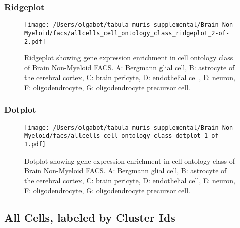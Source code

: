 \newpage
\newpage
\subsubsection{Ridgeplot}
\begin{figure}[h]
\centering
\texttt{[image: /Users/olgabot/tabula-muris-supplemental/Brain\_Non-Myeloid/facs/allcells\_cell\_ontology\_class\_ridgeplot\_2-of-2.pdf]}

\caption{ Ridgeplot  showing gene expression enrichment in cell ontology class of Brain Non-Myeloid FACS. A: Bergmann glial cell, B: astrocyte of the cerebral cortex, C: brain pericyte, D: endothelial cell, E: neuron, F: oligodendrocyte, G: oligodendrocyte precursor cell.}
\end{figure}


\newpage
\newpage
\subsubsection{Dotplot}
\begin{figure}[h]
\centering
\texttt{[image: /Users/olgabot/tabula-muris-supplemental/Brain\_Non-Myeloid/facs/allcells\_cell\_ontology\_class\_dotplot\_1-of-1.pdf]}

\caption{ Dotplot  showing gene expression enrichment in cell ontology class of Brain Non-Myeloid FACS. A: Bergmann glial cell, B: astrocyte of the cerebral cortex, C: brain pericyte, D: endothelial cell, E: neuron, F: oligodendrocyte, G: oligodendrocyte precursor cell.}
\end{figure}


\newpage
\subsection{All Cells, labeled by Cluster Ids}
